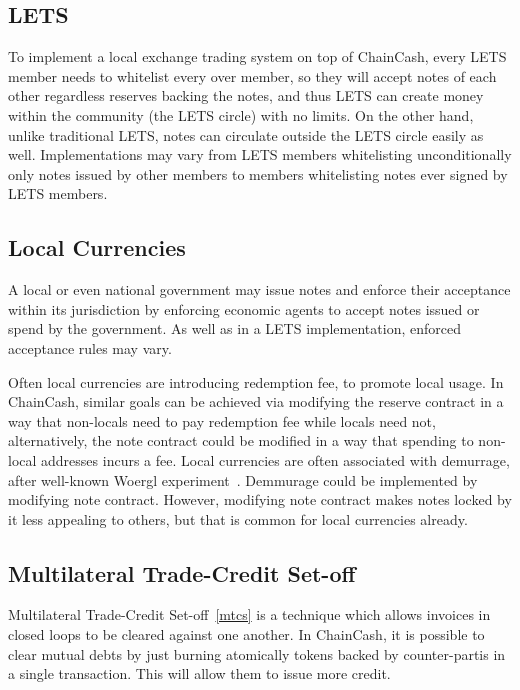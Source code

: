 \documentclass{article}   %
\newcommand{\cc}{ChainCash}
\begin{document}
\subsection{LETS}

To implement a local exchange trading system on top of \cc{}, every LETS member needs to whitelist every over member, so they will accept notes of each other regardless reserves backing the notes, and thus LETS can create money within the community (the LETS circle) with no limits. On the other hand, unlike traditional LETS, notes can circulate outside the LETS circle easily as well. Implementations may vary from LETS members whitelisting unconditionally only notes issued by other members to members whitelisting notes ever signed by LETS members. 


\subsection{Local Currencies}

A local or even national government may issue notes and enforce their acceptance within its jurisdiction by enforcing economic agents to accept notes issued or spend by the government. As well as in a LETS implementation, enforced acceptance rules may vary. 

Often local currencies are introducing redemption fee, to promote local usage. In \cc{}, similar goals can be achieved via modifying the reserve contract in a way that non-locals need to pay redemption fee while locals need not, alternatively, the note contract could be modified in a way that spending to non-local addresses incurs a fee. Local currencies are often associated with demurrage, after well-known Woergl experiment~\cite{unterguggenbercer1934end}. Demmurage could be implemented by modifying note contract. However, modifying note contract makes notes locked by it less appealing to others, but that is common for local currencies already.

\subsection{Multilateral Trade-Credit Set-off}

Multilateral Trade-Credit Set-off~\ref{mtcs} is a technique which allows invoices in closed loops to be cleared against one another.
In \cc{}, it is possible to clear mutual debts by just burning atomically tokens backed by counter-partis in a single
transaction. This will allow them to issue more credit.
\end{document}

